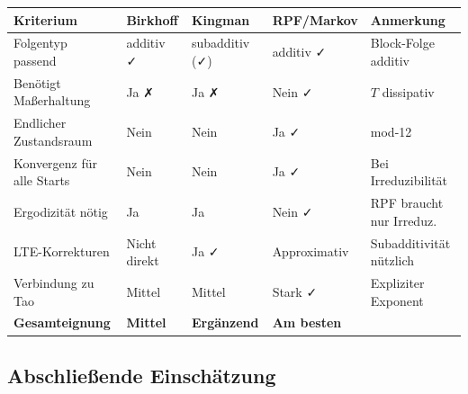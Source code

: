 \documentclass[12pt,a4paper]{article}
\begin{document}
\begin{center}
\renewcommand{\arraystretch}{1.6}
\begin{tabular}{>{\raggedright}p{3.5cm}
                >{\centering}p{1.8cm}
                >{\centering}p{1.8cm}
                >{\centering}p{1.8cm}
                >{\raggedright\arraybackslash}p{3.2cm}}
\toprule
\textbf{Kriterium} & \textbf{Birkhoff} & \textbf{Kingman} & \textbf{RPF/Markov} & \textbf{Anmerkung} \\
\midrule
Folgentyp passend
  & additiv ✓
  & subadditiv (✓)
  & additiv ✓
  & Block-Folge additiv \\
Benötigt Maßerhaltung
  & Ja ✗
  & Ja ✗
  & Nein ✓
  & $T$ dissipativ \\
Endlicher Zustandsraum
  & Nein
  & Nein
  & Ja ✓
  & mod-12 \\
Konvergenz für alle Starts
  & Nein
  & Nein
  & Ja ✓
  & Bei Irreduzibilität \\
Ergodizität nötig
  & Ja
  & Ja
  & Nein ✓
  & RPF braucht nur Irreduz. \\
LTE-Korrekturen
  & Nicht direkt
  & Ja ✓
  & Approximativ
  & Subadditivität nützlich \\
Verbindung zu Tao
  & Mittel
  & Mittel
  & Stark ✓
  & Expliziter Exponent \\
\midrule
\textbf{Gesamteignung}
  & \textcolor{warnorange}{\bfseries Mittel}
  & \textcolor{warnorange}{\bfseries Ergänzend}
  & \textcolor{bewiesengrün}{\bfseries Am besten}
  & \\
\bottomrule
\end{tabular}
\end{center}

\subsection{Abschließende Einschätzung}
\end{document}
